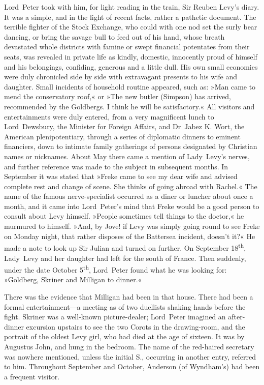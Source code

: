 Lord~Peter took with him, for light reading in the train, Sir Reuben Levy's diary. It was a simple, and in the light of recent facts, rather a pathetic document. The terrible fighter of the Stock Exchange, who could with one nod set the surly bear dancing, or bring the savage bull to feed out of his hand, whose breath devastated whole districts with famine or swept financial potentates from their seats, was revealed in private life as kindly, domestic, innocently proud of himself and his belongings, confiding, generous and a little dull. His own small economies were duly chronicled side by side with extravagant presents to his wife and daughter. Small incidents of household routine appeared, such as: »Man came to mend the conservatory roof,« or »The new butler (Simpson) has arrived, recommended by the Goldbergs. I think he will be satisfactory.« All visitors and entertainments were duly entered, from a very magnificent lunch to Lord~Dewsbury, the Minister for Foreign Affairs, and Dr~Jabez K\@. Wort, the American plenipotentiary, through a series of diplomatic dinners to eminent financiers, down to intimate family gatherings of persons designated by Christian names or nicknames. About May there came a mention of Lady~Levy's nerves, and further reference was made to the subject in subsequent months. In September it was stated that »Freke came to see my dear wife and advised complete rest and change of scene. She thinks of going abroad with Rachel.« The name of the famous nerve-specialist occurred as a diner or luncher about once a month, and it came into Lord~Peter's mind that Freke would be a good person to consult about Levy himself. »People sometimes tell things to the doctor,« he murmured to himself. »And, by Jove! if Levy was simply going round to see Freke on Monday night, that rather disposes of the Battersea incident, doesn't it?« He made a note to look up Sir Julian and turned on further. On September 18\textsuperscript{th}, Lady~Levy and her daughter had left for the south of France. Then suddenly, under the date October 5\textsuperscript{th}, Lord~Peter found what he was looking for: »Goldberg, Skriner and Milligan to dinner.«

There was the evidence that Milligan had been in that house. There had been a formal entertainment—a meeting as of two duellists shaking hands before the fight. Skriner was a well-known picture-dealer; Lord~Peter imagined an after-dinner excursion upstairs to see the two Corots in the drawing-room, and the portrait of the oldest Levy girl, who had died at the age of sixteen. It was by Augustus John, and hung in the bedroom. The name of the red-haired secretary was nowhere mentioned, unless the initial S\@., occurring in another entry, referred to him. Throughout September and October, Anderson (of Wyndham's) had been a frequent visitor.

